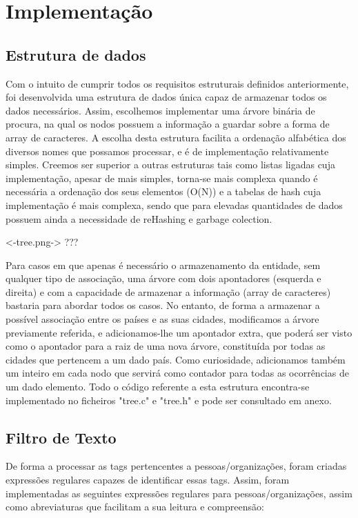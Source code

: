 \section{Implementação}
\label{seq:enamex-imp}
\subsection{Estrutura de dados}
\label{seq:enamex-est}
Com o intuito de cumprir todos os requisitos estruturais definidos anteriormente, foi desenvolvida uma estrutura de dados única capaz de armazenar todos os dados necessários. Assim, escolhemos implementar uma árvore binária de procura, na qual os nodos possuem a informação a guardar sobre a forma de array de caracteres. A escolha desta estrutura facilita a ordenação alfabética dos diversos nomes que possamos processar, e é de implementação relativamente simples. Creemos ser superior a outras estruturas tais como listas ligadas cuja implementação, apesar de mais simples, torna-se mais complexa quando é necessária a ordenação dos seus elementos (O(N)) e a tabelas de hash cuja implementação é mais complexa, sendo que para elevadas quantidades de dados possuem ainda a necessidade de reHashing e garbage colection. 

<-tree.png-> ???

Para casos em que apenas é necessário o armazenamento da entidade, sem qualquer tipo de associação, uma árvore com dois apontadores (esquerda e direita) e com a capacidade de armazenar a informação (array de caracteres) bastaria para abordar todos os casos. No entanto, de forma a armazenar a possível associação entre os países e as suas cidades, modificamos a árvore previamente referida, e adicionamos-lhe um apontador extra, que poderá ser visto como o apontador para a raiz de uma nova árvore, constituída por todas as cidades que pertencem a um dado país. Como curiosidade, adicionamos também um inteiro em cada nodo que servirá como contador para todas as ocorrências de um dado elemento. Todo o código referente a esta estrutura encontra-se implementado no ficheiros "tree.c" e "tree.h" e pode ser consultado em anexo.

\subsection{Filtro de Texto}
\label{seq:enamex-filtro}

De forma a processar as tags pertencentes a pessoas/organizações, foram criadas expressões regulares capazes de identificar essas tags.
Assim, foram implementadas as seguintes expressões regulares para pessoas/organizações, assim como abreviaturas que facilitam a sua leitura e compreensão:

